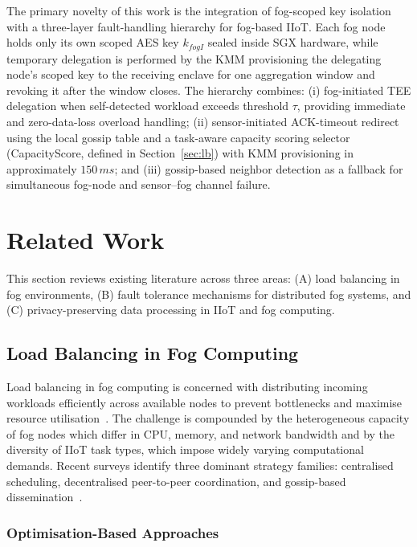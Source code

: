 \documentclass[conference]{IEEEtran}
\begin{document}
    The primary novelty of this work is the integration of fog-scoped key
    isolation with a three-layer fault-handling hierarchy for fog-based
    IIoT. Each fog node holds only its own scoped AES key $k_{fogI}$ sealed
    inside SGX hardware, while temporary delegation is performed by the KMM
    provisioning the delegating node's scoped key to the receiving enclave
    for one aggregation window and revoking it after the window closes. The
    hierarchy combines: (i) fog-initiated TEE delegation when self-detected
    workload exceeds threshold $\tau$, providing immediate and zero-data-loss
    overload handling; (ii) sensor-initiated ACK-timeout redirect using the
    local gossip table and a task-aware capacity scoring selector (CapacityScore,
    defined in Section~\ref{sec:lb}) with KMM provisioning in approximately
    $150\,ms$; and (iii) gossip-based neighbor detection as a fallback for
    simultaneous fog-node and sensor--fog channel failure.

       \section{Related Work}

This section reviews existing literature across three areas: (A) load balancing in fog environments, (B) fault tolerance mechanisms for distributed fog systems, and (C) privacy-preserving data processing in IIoT and fog computing.

\subsection{Load Balancing in Fog Computing}

Load balancing in fog computing is concerned with distributing incoming workloads efficiently across available nodes to prevent bottlenecks and maximise resource utilisation~\cite{kashani2020}. The challenge is compounded by the heterogeneous capacity of fog nodes which differ in CPU, memory, and network bandwidth and by the diversity of IIoT task types, which impose widely varying computational demands. Recent surveys identify three dominant strategy families: centralised scheduling, decentralised peer-to-peer coordination, and gossip-based dissemination~\cite{vijarania2025,nemati2024}.

\subsubsection{Optimisation-Based Approaches}
\end{document}
